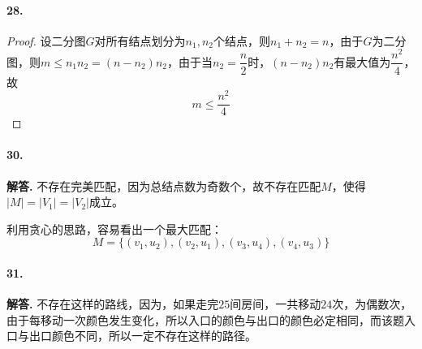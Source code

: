 \documentclass[12pt, a4paper, oneside]{ctexart}
\newenvironment{solution}{\par\noindent\textbf{解答. }}{\bigskip\par}
\begin{document}
\paragraph{28.}\begin{proof}
    设二分图$G$对所有结点划分为$n_1,n_2$个结点，则$n_1+n_2 = n$，由于$G$为二分图，则$m\leqslant n_1n_2=(n-n_2)n_2$，由于当$n_2=\dfrac{n}{2}$时，$(n-n_2)n_2$有最大值为$\dfrac{n^2}{4}$，故
    \begin{equation*}
        m\leqslant \frac{n^2}{4}
    \end{equation*}
\end{proof}
\paragraph{30.}\begin{solution}
    不存在完美匹配，因为总结点数为奇数个，故不存在匹配$M$，使得$|M|=|V_1|=|V_2|$成立。

    利用贪心的思路，容易看出一个最大匹配：
    \begin{equation*}
        M = \{(v_1,u_2),(v_2,u_1),(v_3,u_4),(v_4,u_3)\}
    \end{equation*}
\end{solution}
\paragraph{31.}\begin{solution}
    不存在这样的路线，因为，如果走完$25$间房间，一共移动$24$次，为偶数次，由于每移动一次颜色发生变化，所以入口的颜色与出口的颜色必定相同，而该题入口与出口颜色不同，所以一定不存在这样的路径。
\end{solution}
\end{document}
